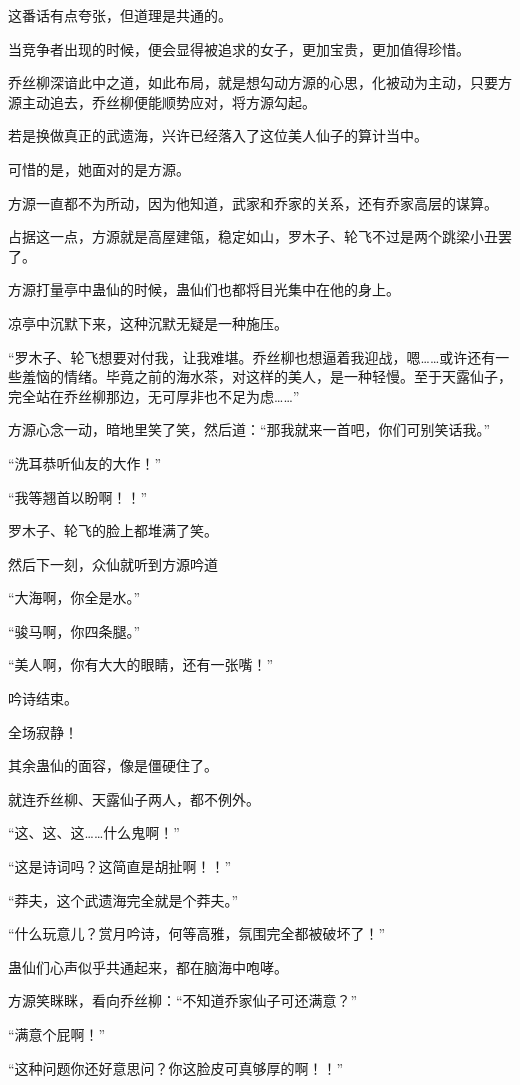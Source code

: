 \begin{this_body}
这番话有点夸张，但道理是共通的。

当竞争者出现的时候，便会显得被追求的女子，更加宝贵，更加值得珍惜。

乔丝柳深谙此中之道，如此布局，就是想勾动方源的心思，化被动为主动，只要方源主动追去，乔丝柳便能顺势应对，将方源勾起。

若是换做真正的武遗海，兴许已经落入了这位美人仙子的算计当中。

可惜的是，她面对的是方源。

方源一直都不为所动，因为他知道，武家和乔家的关系，还有乔家高层的谋算。

占据这一点，方源就是高屋建瓴，稳定如山，罗木子、轮飞不过是两个跳梁小丑罢了。

方源打量亭中蛊仙的时候，蛊仙们也都将目光集中在他的身上。

凉亭中沉默下来，这种沉默无疑是一种施压。

“罗木子、轮飞想要对付我，让我难堪。乔丝柳也想逼着我迎战，嗯……或许还有一些羞恼的情绪。毕竟之前的海水茶，对这样的美人，是一种轻慢。至于天露仙子，完全站在乔丝柳那边，无可厚非也不足为虑……”

方源心念一动，暗地里笑了笑，然后道：“那我就来一首吧，你们可别笑话我。”

“洗耳恭听仙友的大作！”

“我等翘首以盼啊！！”

罗木子、轮飞的脸上都堆满了笑。

然后下一刻，众仙就听到方源吟道

“大海啊，你全是水。”

“骏马啊，你四条腿。”

“美人啊，你有大大的眼睛，还有一张嘴！”

吟诗结束。

全场寂静！

其余蛊仙的面容，像是僵硬住了。

就连乔丝柳、天露仙子两人，都不例外。

“这、这、这……什么鬼啊！”

“这是诗词吗？这简直是胡扯啊！！”

“莽夫，这个武遗海完全就是个莽夫。”

“什么玩意儿？赏月吟诗，何等高雅，氛围完全都被破坏了！”

蛊仙们心声似乎共通起来，都在脑海中咆哮。

方源笑眯眯，看向乔丝柳：“不知道乔家仙子可还满意？”

“满意个屁啊！”

“这种问题你还好意思问？你这脸皮可真够厚的啊！！”


\end{this_body}
